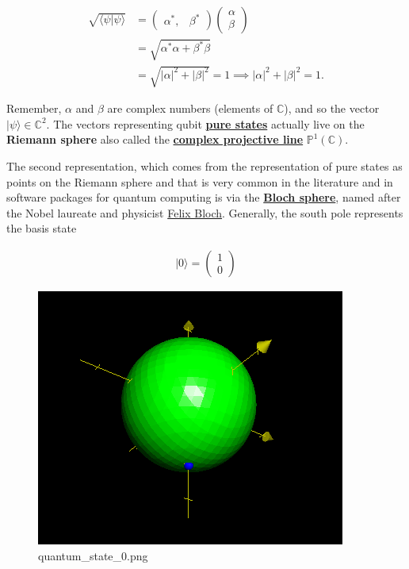 \documentclass[11pt]{article}
\makeatletter
\def\maxwidth{\ifdim\Gin@nat@width>\linewidth\linewidth
    \else\Gin@nat@width\fi}
\let\Oldincludegraphics\includegraphics
\renewcommand{\includegraphics}[1]{\Oldincludegraphics[width=.8\maxwidth]{#1}}
\makeatother
\begin{document}
\begin{align}
\sqrt{\langle \psi | \psi \rangle} &= \begin{pmatrix} \alpha^*, & \beta^* \end{pmatrix}\begin{pmatrix} \alpha \\ \beta \end{pmatrix} \\
&= \sqrt{\alpha^* \alpha+ \beta^* \beta}\\
&= \sqrt{|\alpha|^2 +|\beta|^2} = 1 \implies |\alpha|^2 +|\beta|^2 = 1. 
\end{align}

Remember, \(\alpha\) and \(\beta\) are complex numbers (elements of
\(\mathbb{C}\)), and so the vector \(|\psi \rangle \in \mathbb{C}^2\).
The vectors representing qubit
\textbf{\href{https://en.wikipedia.org/wiki/Quantum_state\#Pure_states}{pure
states}} actually live on the \textbf{Riemann sphere} also called the
\textbf{\href{https://en.wikipedia.org/wiki/Riemann_sphere\#As_the_complex_projective_line}{complex
projective line}} \(\mathbb{P}^1(\mathbb{C})\).

The second representation, which comes from the representation of pure
states as points on the Riemann sphere and that is very common in the
literature and in software packages for quantum computing is via the
\textbf{\href{https://en.wikipedia.org/wiki/Bloch_sphere}{Bloch
sphere}}, named after the Nobel laureate and physicist
\href{https://en.wikipedia.org/wiki/Felix_Bloch}{Felix Bloch}.
Generally, the south pole represents the basis state

\begin{align}
|0\rangle = \begin{pmatrix} 1\\0 \end{pmatrix}
\end{align}

    \begin{figure}
\centering
\includegraphics{quantum_state_0.png}
\caption{quantum\_state\_0.png}
\end{figure}
\end{document}

